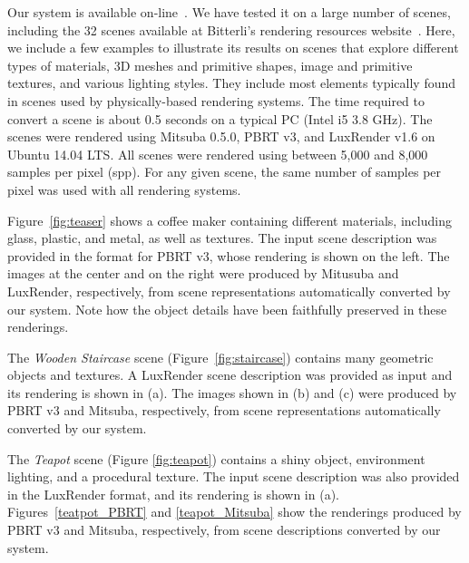 Our system is available on-line~\cite{sceneConverter}.
We have tested it on a large number of scenes, including the 32 scenes available
at Bitterli's rendering resources website~\cite{resources16}. 
Here, we include a few examples to illustrate its results on scenes that explore different 
types of materials, 3D meshes and primitive shapes, image and 
primitive textures, and various lighting styles. They include most elements typically found in scenes used by physically-based rendering systems.  The time required to convert a scene is about 0.5 seconds on a typical PC (Intel i5 3.8 GHz).
% 
%
The scenes were rendered using Mitsuba 0.5.0, PBRT v3, and LuxRender v1.6 on 
Ubuntu 14.04 LTS. All scenes were rendered using between 5,000 and 8,000 samples per pixel (spp). For any given scene,
the same number of samples per pixel was used with all rendering systems. 

Figure~\ref{fig:teaser} shows a coffee maker containing different materials, including glass, plastic, and metal, as well as textures. The input scene description was provided in the format for PBRT v3, whose rendering is shown on the left. The images at the center and on the right were produced by Mitusuba and LuxRender, respectively, from scene representations automatically converted by our system. 
Note how the object details have been faithfully preserved in these renderings.

The \textit{Wooden Staircase} scene (Figure~\ref{fig:staircase}) contains many geometric objects and textures. 
A LuxRender scene description was provided as input and its rendering is shown in (a). The images shown in (b) and (c) were produced 
by PBRT v3 and Mitsuba, respectively, from scene representations automatically converted by our system. 

The \textit{Teapot} scene (Figure \ref{fig:teapot}) contains a shiny object, environment lighting, and a procedural texture. The input scene description was also provided in the LuxRender format, and its rendering is shown in (a). Figures~\ref{teatpot_PBRT} and \ref{teapot_Mitsuba} show the renderings produced by PBRT v3 and Mitsuba, respectively, from scene descriptions converted by our system.

